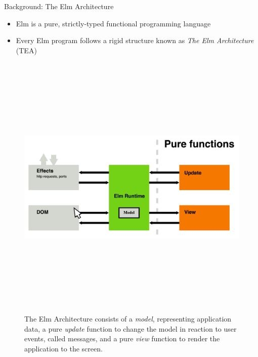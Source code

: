 \documentclass[22pt]{beamer}
\begin{document}
\begin{frame}[fragile]
\begin{textblock}{7.25}
        \begin{block}{\fontsize{37}{20}\selectfont Background: The Elm Architecture}
            \begin{itemize}
                \item Elm is a pure, strictly-typed functional programming language
                \item Every Elm program follows a rigid structure known as \textit{The Elm Architecture} (TEA)
            \end{itemize}
            \begin{figure}
                \includegraphics[height = 13cm]{TheElmArchitecture.png}
                \caption{The Elm Architecture consists of a \textit{model}, representing application data, a pure \textit{update} function to change the model in reaction to user events, called
                    messages,
                    and a pure \textit{view} function to render the application to the screen.}
                \label{Fig:TEA}
            \end{figure}
            \vspace{-6mm}
        \end{block}


\end{textblock}
\end{frame}
\end{document}
